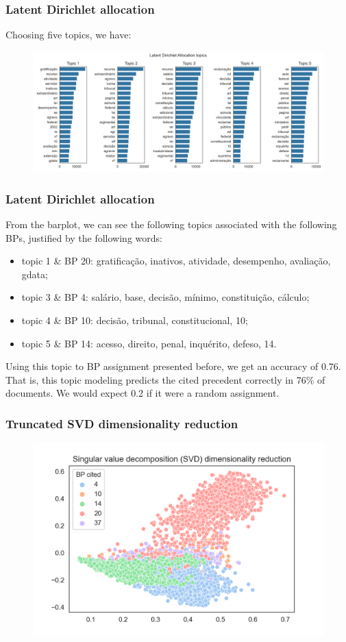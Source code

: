 \documentclass{beamer}
\begin{document}
    \begin{frame}
        \frametitle{Latent Dirichlet allocation}
        Choosing five topics, we have: \pause
        \begin{figure}
            \centering
            \includegraphics[width=\linewidth]{lda_topics.png}
        \end{figure}
    \end{frame}

    \begin{frame}
        \frametitle{Latent Dirichlet allocation}
        From the barplot, we can see the following topics associated with the following BPs, justified by the following words:
        \begin{itemize}
            \item topic 1 \& BP 20: gratificação, inativos, atividade, desempenho, avaliação, gdata;
            \item topic 3 \& BP 4: salário, base, decisão, mínimo, constituição, cálculo;
            \item topic 4 \& BP 10: decisão, tribunal, constitucional, 10;
            \item topic 5 \& BP 14: acesso, direito, penal, inquérito, defeso, 14.
        \end{itemize}
        \pause
        Using this topic to BP assignment presented before, we get an accuracy of 0.76. That is, this topic modeling predicts the cited precedent correctly in 76\% of documents. We would expect 0.2 if it were a random assignment.
    \end{frame}

    \begin{frame}
        \frametitle{Truncated SVD dimensionality reduction}
        \begin{figure}
            \centering
            \includegraphics[width=0.8\linewidth]{svd_1.png}
        \end{figure}
    \end{frame}
\end{document}
